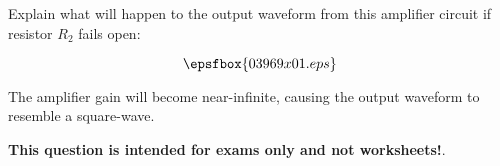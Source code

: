 

Explain what will happen to the output waveform from this amplifier circuit if resistor $R_2$ fails open:

$$\epsfbox{03969x01.eps}$$







The amplifier gain will become near-infinite, causing the output waveform to resemble a square-wave.







{\bf This question is intended for exams only and not worksheets!}.



